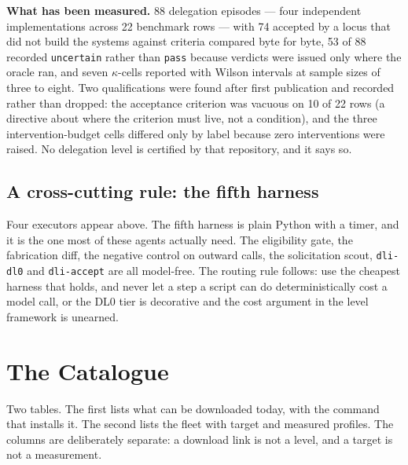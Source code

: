 \documentclass[11pt]{article}
\theoremstyle{definition}
\begin{document}
\textbf{What has been measured.} 88 delegation episodes --- four independent implementations across 22 benchmark rows --- with 74 accepted by a locus that did not build the systems against criteria compared byte for byte, 53 of 88 recorded \texttt{uncertain} rather than \texttt{pass} because verdicts were issued only where the oracle ran, and seven $\kappa$-cells reported with Wilson intervals at sample sizes of three to eight. Two qualifications were found after first publication and recorded rather than dropped: the acceptance criterion was vacuous on 10 of 22 rows (a directive about where the criterion must live, not a condition), and the three intervention-budget cells differed only by label because zero interventions were raised. No delegation level is certified by that repository, and it says so.

\subsection{A cross-cutting rule: the fifth harness}

Four executors appear above. The fifth harness is plain Python with a timer, and it is the one most of these agents actually need. The eligibility gate, the fabrication diff, the negative control on outward calls, the solicitation scout, \texttt{dli-dl0} and \texttt{dli-accept} are all model-free. The routing rule follows: use the cheapest harness that holds, and never let a step a script can do deterministically cost a model call, or the DL0 tier is decorative and the cost argument in the level framework is unearned.

\section{The Catalogue}\label{sec:catalogue}

Two tables. The first lists what can be downloaded today, with the command that installs it. The second lists the fleet with target and measured profiles. The columns are deliberately separate: a download link is not a level, and a target is not a measurement.
\end{document}
